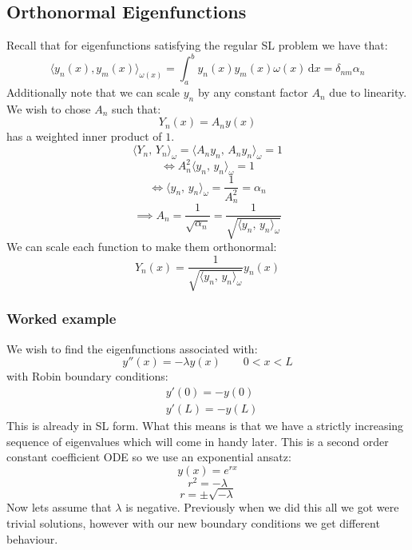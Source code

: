 \documentclass[12pt]{article}
\begin{document}
\subsection{Orthonormal Eigenfunctions}
Recall that for eigenfunctions satisfying the regular SL problem we have that:
\[\langle y_n(x),y_m(x)\rangle_{\omega(x)}=\int^b_ay_n(x)y_m(x)\omega(x)\,\text{d}x=\delta_{nm}\alpha_n\]
Additionally note that we can scale \(y_n\) by any constant factor \(A_n\) due to linearity. We wish to chose \(A_n\) such that:
\[Y_n(x)=A_ny(x)\]
has a weighted inner product of \(1\).
\[\langle Y_n,\,Y_n\rangle_{\omega}=\langle A_ny_n,\,A_ny_n\rangle_{\omega}=1\]
\[\iff A_n^2\langle y_n,\,y_n\rangle_{\omega}=1\]
\[\iff \langle y_n,\,y_n\rangle_{\omega}=\frac{1}{A_n^2}=\alpha_n\]
\[\implies A_n=\frac{1}{\sqrt{\alpha_n}}=\frac{1}{\sqrt{\langle y_n,\,y_n\rangle_{\omega}}}\]
We can scale each function to make them orthonormal:
\[Y_n(x)=\frac{1}{\sqrt{\langle y_n,\,y_n\rangle_{\omega}}}y_n(x)\]
\subsubsection{Worked example}
We wish to find the eigenfunctions associated with:
\[y''(x)=-\lambda y(x)\qquad 0<x<L\]
with Robin boundary conditions:
\begin{align*}
    &y'(0)=-y(0) \\
    &y'(L)=-y(L)
\end{align*}
This is already in SL form. What this means is that we have a strictly increasing sequence of eigenvalues which will come in handy later. This is a second order constant coefficient ODE so we use an exponential ansatz:
\[y(x)=e^{rx}\]
\[r^2=-\lambda\]
\[r=\pm\sqrt{-\lambda}\]
Now lets assume that \(\lambda\) is negative. Previously when we did this all we got were trivial solutions, however with our new boundary conditions we get different behaviour.
\end{document}
